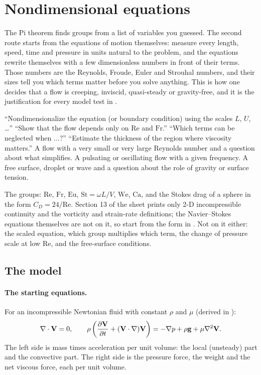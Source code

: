 \section{Nondimensional equations}
\label{sec:nondimensional}

The Pi theorem finds groups from a list of variables you guessed. The second route starts from the equations of motion themselves: measure every length, speed, time and pressure in units natural to the problem, and the equations rewrite themselves with a few dimensionless numbers in front of their terms. Those numbers are the Reynolds, Froude, Euler and Strouhal numbers, and their sizes tell you which terms matter before you solve anything. This is how one decides that a flow is creeping, inviscid, quasi-steady or gravity-free, and it is the justification for every model test in .

\begin{recognise}
``Nondimensionalize the equation (or boundary condition) using the scales $L$, $U$, \dots'' ``Show that the flow depends only on $\mathrm{Re}$ and $\mathrm{Fr}$.'' ``Which terms can be neglected when $\dots$?'' ``Estimate the thickness of the region where viscosity matters.'' A flow with a very small or very large Reynolds number and a question about what simplifies. A pulsating or oscillating flow with a given frequency. A free surface, droplet or wave and a question about the role of gravity or surface tension.
\end{recognise}

\begin{onsheet}
The groups: $\mathrm{Re}$, $\mathrm{Fr}$, $\mathrm{Eu}$, $\mathrm{St} = \omega L/V$, $\mathrm{We}$, $\mathrm{Ca}$, and the Stokes drag of a sphere in the form $C_D = 24/\mathrm{Re}$. Section 13 of the sheet prints only 2-D incompressible continuity and the vorticity and strain-rate definitions; the Navier--Stokes equations themselves are not on it, so start from the form in . Not on it either: the scaled equation, which group multiplies which term, the change of pressure scale at low $\mathrm{Re}$, and the free-surface conditions.
\end{onsheet}

\subsection*{The model}

\paragraph{The starting equations.} For an incompressible Newtonian fluid with constant $\rho$ and $\mu$ (derived in ):
\[
\nabla\cdot\mathbf{V} = 0, \qquad
\rho\left(\frac{\partial \mathbf{V}}{\partial t} + (\mathbf{V}\cdot\nabla)\mathbf{V}\right) = -\nabla p + \rho\mathbf{g} + \mu\nabla^2\mathbf{V} .
\]
The left side is mass times acceleration per unit volume: the local (unsteady) part and the convective part. The right side is the pressure force, the weight and the net viscous force, each per unit volume.

